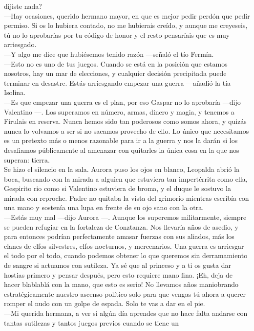 \documentclass[
  letterpaper,
]{book}
\begin{document}
dijiste nada?\\
---Hay ocasiones, querido hermano mayor, en que es mejor pedir perdón
que pedir permiso. Si os lo hubiera contado, no me hubierais creído, y
aunque me creyeseis, tú no lo aprobarías por tu código de honor y el
resto pensaríais que es muy arriesgado.\\
---Y algo me dice que hubiésemos tenido razón ---señaló el tío Fermín.\\
---Esto no es uno de tus juegos. Cuando se está en la posición que
estamos nosotros, hay un mar de elecciones, y cualquier decisión
precipitada puede terminar en desastre. Estás arriesgando empezar una
guerra ---añadió la tía Isolina.\\
---Es que empezar una guerra es el plan, por eso Gaspar no lo aprobaría
---dijo Valentino ---. Los superamos en número, armas, dinero y magia, y
tenemos a Firulais en reserva. Nunca hemos sido tan poderosos como somos
ahora, y quizás nunca lo volvamos a ser si no sacamos provecho de ello.
Lo único que necesitamos es un pretexto más o menos razonable para ir a
la guerra y nos la darán si los desafiamos públicamente al amenazar con
quitarles la única cosa en la que nos superan: tierra. ~\\
Se hizo el silencio en la sala. Aurora puso los ojos en blanco, Leopalda
abrió la boca, buscando con la mirada a alguien que estuviera tan
impertérrita como ella, Gespirito rio como si Valentino estuviera de
broma, y el duque le sostuvo la mirada con reproche. Padre no quitaba la
vista del grimorio mientras escribía con una mano y sostenía una lupa en
frente de su ojo sano con la otra.\\
---Estás muy mal ---dijo Aurora ---. Aunque los superemos militarmente,
siempre se pueden refugiar en la fortaleza de Conztanza. Nos llevaría
años de asedio, y para entonces podrían perfectamente amasar fuerzas con
sus aliados, más los clanes de elfos silvestres, elfos nocturnos, y
mercenarios. Una guerra es arriesgar el todo por el todo, cuando podemos
obtener lo que queremos sin derramamiento de sangre si actuamos con
sutileza. Ya sé que al princeso y a ti os gusta dar hostias primero y
pensar después, pero esto requiere mano fina. ¡Eh, deja de hacer
blablablá con la mano, que esto es serio! No llevamos años maniobrando
estratégicamente nuestro ascenso político solo para que vengas tú ahora
a querer romper el nudo con un golpe de espada. Solo te vas a dar en el
pie.\\
---Mi querida hermana, a ver si algún día aprendes que no hace falta
andarse con tantas sutilezas y tantos juegos previos cuando se tiene un
\end{document}
